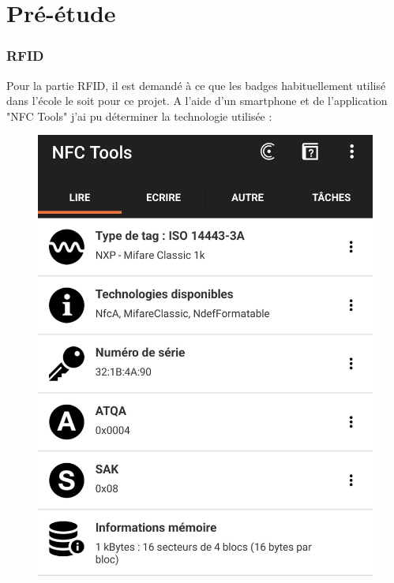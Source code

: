 \part{Pré-étude}

\section{RFID}

Pour la partie RFID, il est demandé à ce que les badges habituellement utilisé dans l'école le soit pour ce projet. A l'aide d'un smartphone et de l'application "NFC Tools" j'ai pu déterminer la technologie utilisée :

\begin{figure}[h]
	\centering
	\includegraphics[width=0.7\linewidth]{2312_Images/2312_Pre-etude/Screenshot_NFC_Tools}
	\caption{}
	\label{fig:screenshotnfctools}
\end{figure}

